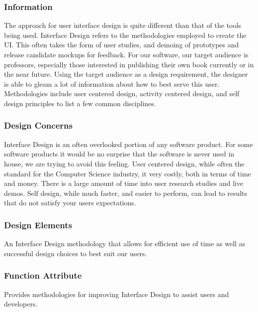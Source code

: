 \documentclass[letterpaper, 10pt, draftclsnofoot, compsoc, onecolumn]{IEEEtran}
\begin{document}
\subsubsection{Information}
{\noindent The approach for user interface design is quite different
than that of the tools being used. Interface Design refers to the
methodologies employed to create the UI. This often takes the form of
user studies, and demoing of prototypes and release candidate mockups
for feedback. For our software, our target audience is professors,
especially those interested in publishing their own book currently or
in the near future. Using the target audience as a design requirement,
the designer is able to gleam a lot of information about how to best
serve this user.
Methodologies include user centered design, activity centered design,
and self design principles to list a few common disciplines.   \par}

\subsubsection{Design Concerns}
{\noindent Interface Design is an often overlooked portion of any software product.
For some software products it would be no surprise that the software is never
used in house, we are trying to avoid this feeling.
User centered design, while often the standard for the Computer Science industry, it
very costly, both in terms of time and money. There is a large amount of time into
user research studies and live demos. Self design, while much faster,
and easier to perform, can lead to results that do not satisfy your users expectations.\par}

\subsubsection{Design Elements}
{\noindent An Interface Design methodology that allows for efficient
use of time as well as successful design choices to best suit our users. \par}

\subsubsection{Function Attribute}
{\noindent Provides methodologies for improving Interface Design to assist
users and developers. \par}

\newpage
\end{document}
